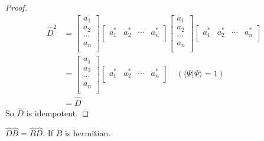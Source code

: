\begin{proof}
\begin{equation}\label{}
\begin{split}
  \hat{D}^{2} &= \begin{bmatrix}
a_{1} \\
a_{2} \\
\cdots   \\
a_{n} \\
\end{bmatrix}
\begin{bmatrix}
a_{1}^{*} & a_{2}^{*} & \cdots & a_{n}^{*} \\
\end{bmatrix}
\begin{bmatrix}
a_{1} \\
a_{2} \\
\cdots   \\
a_{n} \\
\end{bmatrix}
\begin{bmatrix}
a_{1}^{*} & a_{2}^{*} & \cdots & a_{n}^{*} \\
\end{bmatrix}  \\
    &= \begin{bmatrix}
a_{1} \\
a_{2} \\
\cdots   \\
a_{n} \\
\end{bmatrix}
\begin{bmatrix}
a_{1}^{*} & a_{2}^{*} & \cdots & a_{n}^{*} \\
\end{bmatrix}  \quad (\langle\Psi|\Psi\rangle = 1)\\
&= \hat{D}
\end{split}
\end{equation}
So $\hat{D}$ is idempotent. \qedhere
\end{proof}

\begin{theorem}\label{}
$\hat{D}\hat{B} = \hat{B}\hat{D}$. If $\hat{B}$ is hermitian.
\end{theorem}

